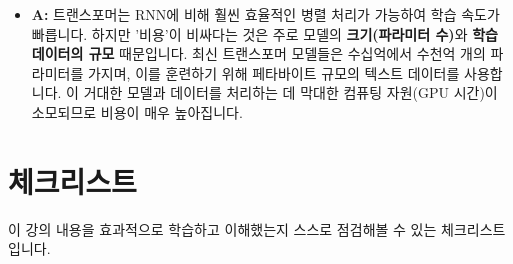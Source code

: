 \documentclass[11pt,a4paper]{article}
\theoremstyle{definition}
\begin{document}
\begin{itemize}
    \begin{itemize}
        \item \textbf{A:} 트랜스포머는 RNN에 비해 훨씬 효율적인 병렬 처리가 가능하여 학습 속도가 빠릅니다. 하지만 '비용'이 비싸다는 것은 주로 모델의 \textbf{크기(파라미터 수)}와 \textbf{학습 데이터의 규모} 때문입니다. 최신 트랜스포머 모델들은 수십억에서 수천억 개의 파라미터를 가지며, 이를 훈련하기 위해 페타바이트 규모의 텍스트 데이터를 사용합니다. 이 거대한 모델과 데이터를 처리하는 데 막대한 컴퓨팅 자원(GPU 시간)이 소모되므로 비용이 매우 높아집니다.
    \end{itemize}
\end{itemize}

\newpage
\section{체크리스트}
이 강의 내용을 효과적으로 학습하고 이해했는지 스스로 점검해볼 수 있는 체크리스트입니다.
\end{document}

